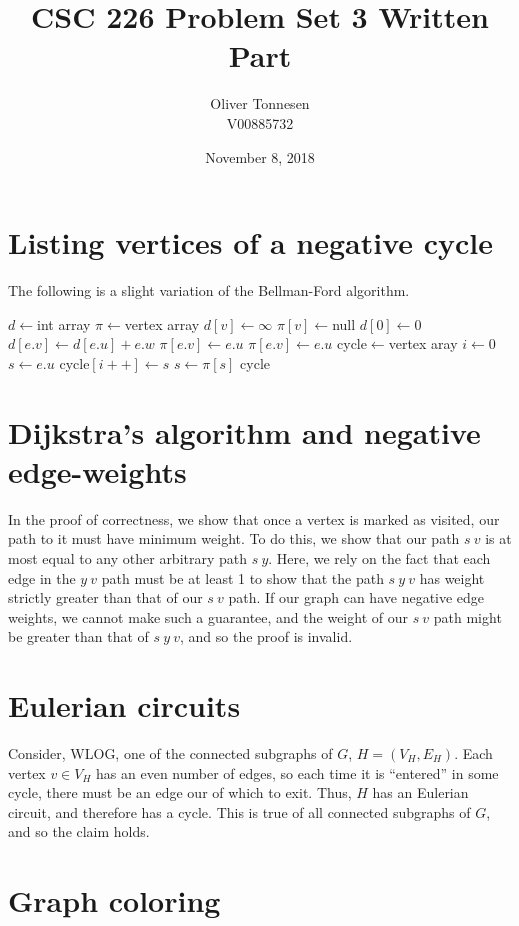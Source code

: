 \documentclass{article}
\title{CSC 226 Problem Set 3 Written Part}
\author{%
	Oliver Tonnesen\\
	V00885732}
\date{November 8, 2018}
\begin{document}
\maketitle
\section{Listing vertices of a negative cycle}
The following is a slight variation of the Bellman-Ford algorithm.
\begin{algorithmic}[1]
	\State $d\gets$int array
	\State $\pi\gets$vertex array
		\State $d[v]\gets\infty$
		\State $\pi[v]\gets$null
	\EndFor
	\State $d[0]\gets0$
				\State $d[e.v]\gets d[e.u]+e.w$
				\State $\pi[e.v]\gets e.u$
			\EndIf
		\EndFor
	\EndFor
			\State $\pi[e.v]\gets e.u$
		\EndIf
	\EndFor
	\State cycle$\gets$vertex aray
	\State $i\gets0$
	\State $s\gets e.u$
		\State cycle$[i++]\gets s$
		\State $s\gets\pi[s]$
	\EndWhile
	\State\Return cycle
	\EndFunction
\end{algorithmic}
\section{Dijkstra's algorithm and negative edge-weights}
In the proof of correctness, we show that once a vertex is marked as visited,
our path to it must have minimum weight. To do this, we show that our path
$s~v$ is at most equal to any other arbitrary path $s~y$. Here, we rely on the
fact that each edge in the $y~v$ path must be at least 1 to show that the path
$s~y~v$ has weight strictly greater than that of our $s~v$ path. If our graph
can have negative edge weights, we cannot make such a guarantee, and the weight
of our $s~v$ path might be greater than that of $s~y~v$, and so the proof is
invalid.
\section{Eulerian circuits}
Consider, WLOG, one of the connected subgraphs of $G$, $H=(V_H, E_H)$. Each
vertex $v\in V_H$ has an even number of edges, so each time it is ``entered'' in
some cycle, there must be an edge our of which to exit. Thus, $H$ has an
Eulerian circuit, and therefore has a cycle. This is true of all connected
subgraphs of $G$, and so the claim holds.
\section{Graph coloring}
\end{document}

